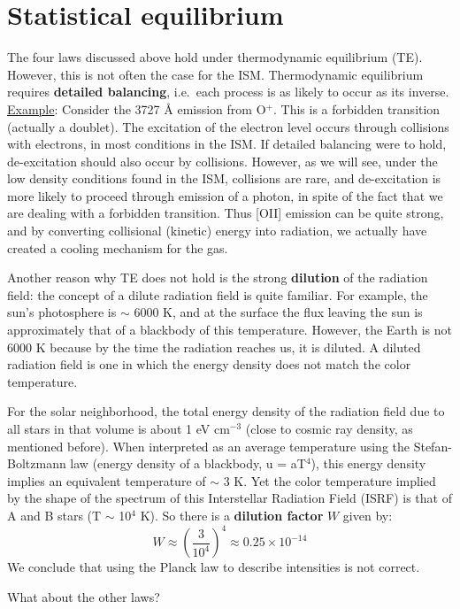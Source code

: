 \documentclass[12pt]{article}
\begin{document}
\section{Statistical equilibrium}
\textcolor{bred}{The four laws discussed above hold under
thermodynamic equilibrium (TE).}
However, this is not often the case for the ISM\@.
Thermodynamic equilibrium requires \textbf{detailed balancing},
i.e.\ each process is as likely to occur as its inverse.
\underline{Example}: Consider the 3727 \AA{} emission from O$^{+}$. This is
a forbidden transition (actually a doublet). The excitation of the electron
level occurs through collisions with electrons, in most conditions in the
ISM\@. If detailed balancing were to hold, de-excitation should also occur
by collisions. However, as we will see, under the low density conditions
found in the ISM, collisions are rare, and de-excitation is more likely to
proceed through emission of a photon, in spite of the fact that we are
dealing with a forbidden transition. Thus [OII] emission can be quite strong,
and by converting collisional (kinetic) energy into radiation, we actually have
created a cooling mechanism for the gas.

Another reason why TE does not hold is the strong \textbf{dilution} of
the radiation field: the concept of a dilute radiation field is quite familiar.
For example, the sun's photosphere is $\sim$ 6000 K, and at the surface the
flux leaving the sun is approximately that of a blackbody of this temperature.
However, the Earth is not 6000 K because by the time the radiation reaches us,
it is diluted. \textcolor{bred}{A diluted radiation field is one in which
the energy density does not match the color temperature.}

For the solar neighborhood, the total energy density of the
radiation field due to all stars in that volume is about 1 eV cm$^{-3}$
(close to cosmic ray density, as mentioned before). When interpreted as an
average temperature using the Stefan-Boltzmann law (energy density of a
blackbody, u = aT$^{4}$), this energy density implies an equivalent temperature
of $\sim$ 3 K. Yet the color temperature implied by the shape of the spectrum
of this Interstellar Radiation Field (ISRF) is that of A and B stars
(T $\sim$ 10$^{4}$ K). So there is a \textbf{dilution factor} $W$ given by:
$${ W \approx (\frac{3}{10^{4}})^{4} \approx 0.25\times10^{-14}
}$$
We conclude that using the Planck law to describe intensities is not correct.

What about the other laws?
\end{document}
